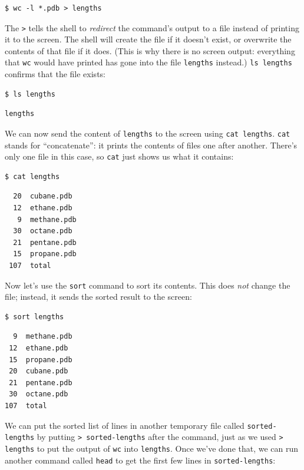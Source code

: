 \documentclass[]{book}
\newcommand{\gdef}[2]{\emph{#2}}
\begin{document}
\begin{verbatim}
$ wc -l *.pdb > lengths
\end{verbatim}

The \texttt{\textgreater{}} tells the shell to
\gdef{g:redirect}{redirect} the command's output to a file instead
of printing it to the screen. The shell will create the file if it
doesn't exist, or overwrite the contents of that file if it does. (This
is why there is no screen output: everything that \texttt{wc} would have
printed has gone into the file \texttt{lengths} instead.)
\texttt{ls lengths} confirms that the file exists:

\begin{verbatim}
$ ls lengths
\end{verbatim}

\begin{verbatim}
lengths
\end{verbatim}

We can now send the content of \texttt{lengths} to the screen using
\texttt{cat lengths}. \texttt{cat} stands for ``concatenate'': it prints
the contents of files one after another. There's only one file in this
case, so \texttt{cat} just shows us what it contains:

\begin{verbatim}
$ cat lengths
\end{verbatim}

\begin{verbatim}
  20  cubane.pdb
  12  ethane.pdb
   9  methane.pdb
  30  octane.pdb
  21  pentane.pdb
  15  propane.pdb
 107  total
\end{verbatim}

Now let's use the \texttt{sort} command to sort its contents. This does
\emph{not} change the file; instead, it sends the sorted result to the
screen:

\begin{verbatim}
$ sort lengths
\end{verbatim}

\begin{verbatim}
  9  methane.pdb
 12  ethane.pdb
 15  propane.pdb
 20  cubane.pdb
 21  pentane.pdb
 30  octane.pdb
107  total
\end{verbatim}

We can put the sorted list of lines in another temporary file called
\texttt{sorted-lengths} by putting
\texttt{\textgreater{} sorted-lengths} after the command, just as we
used \texttt{\textgreater{} lengths} to put the output of \texttt{wc}
into \texttt{lengths}. Once we've done that, we can run another command
called \texttt{head} to get the first few lines in
\texttt{sorted-lengths}:
\end{document}
